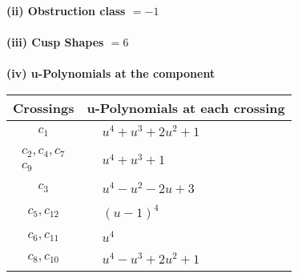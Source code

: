 \documentclass[1p]{elsarticle_modified}
\theoremstyle{definition}
\begin{document}
\flushleft \textbf{(ii) Obstruction class $= -1$}\\~\\
\flushleft \textbf{(iii) Cusp Shapes $= 6$}\\~\\
\newpage\renewcommand{\arraystretch}{1}
\flushleft \textbf{(iv) u-Polynomials at the component}\newline \\
\begin{tabular}{m{50pt}|m{274pt}}
Crossings & \hspace{64pt}u-Polynomials at each crossing \\
\hline $$\begin{aligned}c_{1}\end{aligned}$$&$\begin{aligned}
&u^4+u^3+2 u^2+1
\end{aligned}$\\
\hline $$\begin{aligned}c_{2},c_{4},c_{7}\\c_{9}\end{aligned}$$&$\begin{aligned}
&u^4+u^3+1
\end{aligned}$\\
\hline $$\begin{aligned}c_{3}\end{aligned}$$&$\begin{aligned}
&u^4- u^2-2 u+3
\end{aligned}$\\
\hline $$\begin{aligned}c_{5},c_{12}\end{aligned}$$&$\begin{aligned}
&(u-1)^4
\end{aligned}$\\
\hline $$\begin{aligned}c_{6},c_{11}\end{aligned}$$&$\begin{aligned}
&u^4
\end{aligned}$\\
\hline $$\begin{aligned}c_{8},c_{10}\end{aligned}$$&$\begin{aligned}
&u^4- u^3+2 u^2+1
\end{aligned}$\\
\hline
\end{tabular}\\~\\
\end{document}
